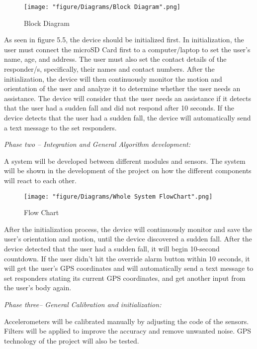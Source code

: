 \begin{figure}[htbp]
	\centering
		\texttt{[image: "figure/Diagrams/Block Diagram".png]}
	\caption{Block Diagram}
	\label{fig:Block Diagram}
\end{figure}

As seen in figure 5.5, the device should be initialized first. In initialization, the user must connect the microSD Card first to a computer/laptop to set the user’s name, age, and address. The user must also set the contact details of the responder/s, specifically, their names and contact numbers. After the initialization, the device will then continuously monitor the motion and orientation of the user and analyze it to determine whether the user needs an assistance. The device will consider that the user needs an assistance if it detects that the user had a sudden fall and did not respond after 10 seconds. If the device detects that the user had a sudden fall, the device will automatically send a text message to the set responders.

\noindent \textit{Phase two – Integration and General Algorithm development:}

A system will be developed between different modules and sensors. The system will be shown in the development of the project on how the different components will react to each other.

\begin{figure}[htbp]
	\centering
		\texttt{[image: "figure/Diagrams/Whole System FlowChart".png]}
	\caption{Flow Chart}
	\label{fig:Whole System FlowChart}
\end{figure}

After the initialization process, the device will continuously monitor and save the user's orientation and motion, until the device discovered a sudden fall. After the device detected that the user had a sudden fall, it will begin 10-second countdown. If the user didn’t hit the override alarm button within 10 seconds, it will get the user’s GPS coordinates and will automatically send a text message to set responders stating its current GPS coordinates, and get another input from the user’s body again.

\noindent \textit{Phase three– General Calibration and initialization:}

Accelerometers will be calibrated manually by adjusting the code of the sensors. Filters will be applied to improve the accuracy and remove unwanted noise. GPS technology of the project will also be tested.

